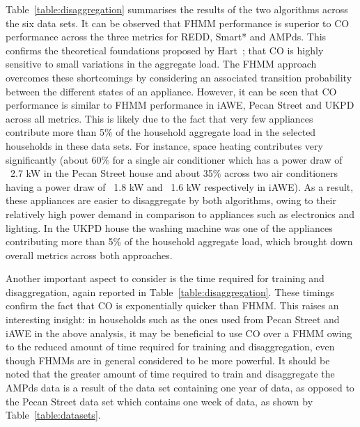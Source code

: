 \documentclass{sig-alternate}
\newcommand{\bluecolor}[1]{\textcolor{blue}{#1}}
\newcommand{\tabref}[1]{Table~\ref{#1}}
\begin{document}
\tabref{table:disaggregation} summarises the results of the two algorithms across the six data sets. It can be observed that FHMM performance is superior to CO performance across the three metrics for REDD, Smart* and AMPds. This confirms the theoretical foundations proposed by Hart~\cite{hart_1992}; that CO is highly sensitive to small variations in the aggregate load. The FHMM approach overcomes these shortcomings by considering an associated transition probability between the different states of an appliance. However, it can be seen that CO performance is similar to FHMM performance in iAWE, Pecan Street and UKPD across all metrics. This is likely due to the fact that very few appliances contribute more than 5\% of the household aggregate load in the selected households in these data sets. For instance, space heating contributes very significantly (about 60\% for a single air conditioner which has a power draw of ~2.7 kW in the Pecan Street house and about 35\% across two air conditioners having a power draw of ~1.8 kW and ~1.6 kW respectively in iAWE). As a result, these appliances are easier to disaggregate by both algorithms, owing to their relatively high power demand in comparison to appliances such as electronics and lighting. In the UKPD house the washing machine was one of the appliances contributing more than 5\% of the household aggregate load, which brought down overall metrics across both approaches. 

Another important aspect to consider is the time required for training and disaggregation, again reported in \tabref{table:disaggregation}. These timings confirm the fact that CO is exponentially quicker than FHMM. This raises an interesting insight: in households such as the ones used from Pecan Street and iAWE in the above analysis, it may be beneficial to use CO over a FHMM owing to the reduced amount of time required for training and disaggregation, even though FHMMs are in general considered to be more powerful. It should be noted that the greater amount of time required to train and disaggregate the AMPds data is a result of the data set containing one year of data, as opposed to the Pecan Street data set which contains one week of data, as shown by \tabref{table:datasets}.
\end{document}
